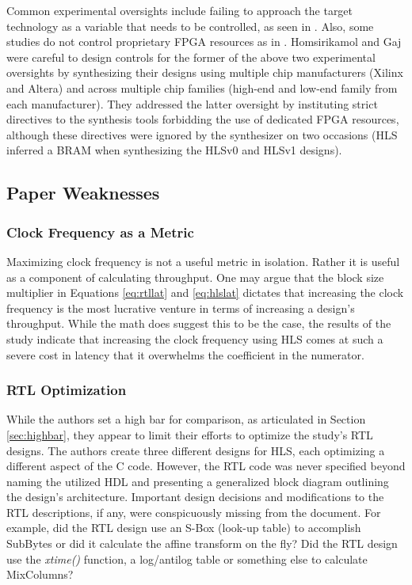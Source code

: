 \documentclass[12pt,journal,compsoc,onecolumn]{IEEEtran}
\begin{document}
Common experimental oversights include failing to approach the target technology as a variable that needs to be controlled, as seen in \cite{skalicky}. Also, some studies do not control proprietary FPGA resources as in \cite{10}. Homsirikamol and Gaj were careful to design controls for the former of the above two experimental oversights by synthesizing their designs using multiple chip manufacturers (Xilinx and Altera) and across multiple chip families (high-end and low-end family from each manufacturer). They addressed the latter oversight by instituting strict directives to the synthesis tools forbidding the use of dedicated FPGA resources, although these directives were ignored by the synthesizer on two occasions (HLS inferred a BRAM when synthesizing the HLSv0 and HLSv1 designs).

\subsection{Paper Weaknesses}\label{sec:weaknesses}
\subsubsection{Clock Frequency as a Metric}
Maximizing clock frequency is not a useful metric in isolation. Rather it is useful as a component of calculating throughput. One may argue that the block size multiplier in Equations \ref{eq:rtllat} and \ref{eq:hlslat} dictates that increasing the clock frequency is the most lucrative venture in terms of increasing a design's throughput. While the math does suggest this to be the case, the results of the study indicate that increasing the clock frequency using HLS comes at such a severe cost in latency that it overwhelms the coefficient in the numerator.

\subsubsection{RTL Optimization}\label{sec:rtlop}
While the authors set a high bar for comparison, as articulated in Section \ref{sec:highbar}, they appear to limit their efforts to optimize the study's RTL designs. The authors create three different designs for HLS, each optimizing a different aspect of the C code. However, the RTL code was never specified beyond naming the utilized HDL and presenting a generalized block diagram outlining the design's architecture. Important design decisions and modifications to the RTL descriptions, if any, were conspicuously missing from the document. For example, did the RTL design use an S-Box (look-up table) to accomplish SubBytes or did it calculate the affine transform on the fly? Did the RTL design use the \emph{xtime()} function, a log/antilog table or something else to calculate MixColumns? 
\end{document}
